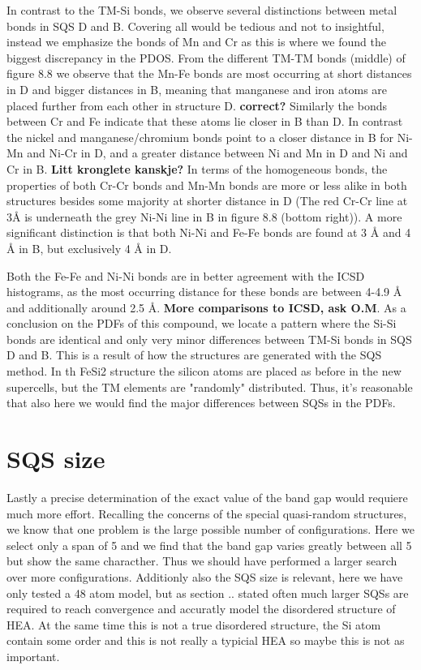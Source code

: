 In contrast to the TM-Si bonds, we observe several distinctions between metal bonds in SQS D and B. Covering all would be tedious and not to insightful, instead we emphasize the bonds of Mn and Cr as this is where we found the biggest discrepancy in the PDOS. From the different TM-TM bonds (middle) of figure 8.8 we observe that the Mn-Fe bonds are most occurring at short distances in D and bigger distances in B, meaning that manganese and iron atoms are placed further from each other in structure D. \textbf{correct?} Similarly the bonds between Cr and Fe   indicate that these atoms lie closer in B than D. In contrast the nickel and manganese/chromium bonds point to a closer distance in B for Ni-Mn and Ni-Cr in D, and a greater distance between Ni and Mn in D and Ni and Cr in B. \textbf{Litt kronglete kanskje?} In terms of the homogeneous bonds, the properties of both Cr-Cr bonds and Mn-Mn bonds are more or less alike in both structures besides some majority at shorter distance in D (The red Cr-Cr line at 3Å is underneath the grey Ni-Ni line in B in figure 8.8 (bottom right)). A more significant distinction is that both Ni-Ni and Fe-Fe bonds are found at 3 Å and 4 Å in B, but exclusively 4 Å in D.    

Both the Fe-Fe and Ni-Ni bonds are in better agreement with the ICSD histograms, as the most occurring distance for these bonds are between 4-4.9 Å and additionally around 2.5 Å. \textbf{More comparisons to ICSD, ask O.M}. As a conclusion on the PDFs of this compound, we locate a pattern where the Si-Si bonds are identical and only very minor differences between TM-Si bonds in SQS D and B. This is a result of how the structures are generated with the SQS method. In th FeSi2 structure the silicon atoms are placed as before in the new supercells, but the TM elements are "randomly" distributed. Thus, it's reasonable that also here we would find the major differences between SQSs in the PDFs. 

\newpage
\section{SQS size}

Lastly a precise determination of the exact value of the band gap would requiere much more effort. Recalling the concerns of the special quasi-random structures, we know that one problem is the large possible number of configurations. Here we select only a span of 5 and we find that the band gap varies greatly between all 5 but show the same characther. Thus we should have performed a larger search over more configurations. Additionly also the SQS size is relevant, here we have only tested a 48 atom model, but as section .. stated often much larger SQSs are required to reach convergence and accuratly model the disordered structure of HEA. At the same time this is not a true disordered structure, the Si atom contain some order and this is not really a typicial HEA so maybe this is not as important.

